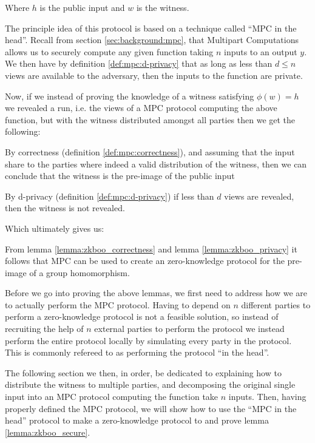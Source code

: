 Where $h$ is the public input and $w$ is the witness.

The principle idea of this protocol is based on a technique called ``MPC in the
head''. Recall from section \ref{sec:background:mpc}, that
Multipart Computations allows us to securely compute any given function taking
$n$ inputs to an output $y$.
We then have by definition \ref{def:mpc:d-privacy} that as long as less than
$d \leq n$ views are available to the adversary, then the inputs to the function
are private.

Now, if we instead of proving the knowledge of a witness satisfying $\phi(w) = h$
we revealed a run, i.e. the views of a MPC protocol computing the above
function, but with the witness distributed amongst all parties then we get the
following:

\begin{lemma}
\label{lemma:zkboo_correctness}
By correctness (definition \ref{def:mpc:correctness}), and assuming that
the input share to the parties where indeed a valid distribution of the
witness, then we can conclude that the witness is the pre-image of the public input
\end{lemma}

\begin{lemma}
\label{lemma:zkboo_privacy}
By d-privacy (definition \ref{def:mpc:d-privacy}) if less than $d$ views are
revealed, then the witness is not revealed.
\end{lemma}

Which ultimately gives us:

\begin{lemma}
\label{lemma:zkboo_secure}
From lemma \ref{lemma:zkboo_correctness} and lemma \ref{lemma:zkboo_privacy} it
follows that MPC can be used to create an zero-knowledge protocol for the
pre-image of a group homomorphism.
\end{lemma}

Before we go into proving the above lemmas, we first need to address how we are
to actually perform the MPC protocol. Having to depend on $n$ different parties
to perform a zero-knowledge protocol is not a feasible solution, so instead of
recruiting the help of $n$ external parties to perform the protocol we instead
perform the entire protocol locally by simulating every party in the protocol.
This is commonly refereed to as performing the protocol ``in the head''.


The following section we then, in order, be dedicated to explaining how to
distribute the witness to multiple parties, and decomposing the original single
input into an MPC protocol computing the function take $n$ inputs. Then, having
properly defined the MPC protocol, we will show how to use the ``MPC in the
head'' protocol to make a zero-knowledge protocol to and prove lemma \ref{lemma:zkboo_secure}.

